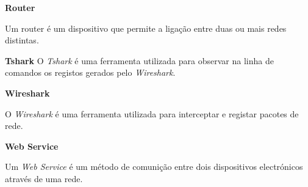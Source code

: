 \begin{description}
    \item \textbf{Router}

    Um router é um dispositivo que permite a ligação entre duas ou mais redes distintas.
\end{description}

\begin{description}
    \item \textbf{Tshark}
    O \textit{Tshark} é uma ferramenta utilizada para observar na linha de comandos os registos gerados pelo \textit{Wireshark}.
\end{description}

\begin{description}
    \item \textbf{Wireshark}

    O \textit{Wireshark} é uma ferramenta utilizada para interceptar e registar pacotes de rede.
\end{description}

\begin{description}
    \item \textbf{Web Service}
    
    Um \textit{Web Service} é um método de comunição entre dois dispositivos electrónicos através de uma rede.
\end{description}
